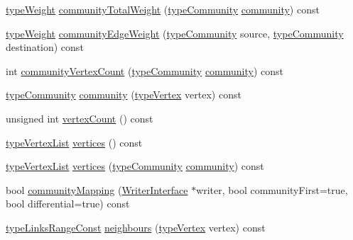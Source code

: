 \begin{DoxyCompactItemize}
\item 
\hyperlink{edge_8h_a2e7ea3be891ac8b52f749ec73fee6dd2}{type\+Weight} \hyperlink{classDynCommBase_a9e7f2493dd9f2381dbfbe94b91ac49f4}{community\+Total\+Weight} (\hyperlink{graphUndirectedGroupable_8h_a914da95c9ea7f14f4b7f875c36818556}{type\+Community} \hyperlink{classDynCommBase_a651753518a2de4ea52caea518e74d878}{community}) const
\item 
\hyperlink{edge_8h_a2e7ea3be891ac8b52f749ec73fee6dd2}{type\+Weight} \hyperlink{classDynCommBase_a1ef408ec71d82b008fc0229416c77b61}{community\+Edge\+Weight} (\hyperlink{graphUndirectedGroupable_8h_a914da95c9ea7f14f4b7f875c36818556}{type\+Community} source, \hyperlink{graphUndirectedGroupable_8h_a914da95c9ea7f14f4b7f875c36818556}{type\+Community} destination) const
\item 
int \hyperlink{classDynCommBase_ad02f1853b63e1ceaf24b05cfdbcf7a49}{community\+Vertex\+Count} (\hyperlink{graphUndirectedGroupable_8h_a914da95c9ea7f14f4b7f875c36818556}{type\+Community} \hyperlink{classDynCommBase_a651753518a2de4ea52caea518e74d878}{community}) const
\item 
\hyperlink{graphUndirectedGroupable_8h_a914da95c9ea7f14f4b7f875c36818556}{type\+Community} \hyperlink{classDynCommBase_a651753518a2de4ea52caea518e74d878}{community} (\hyperlink{edge_8h_a5fbd20c46956d479cb10afc9855223f6}{type\+Vertex} vertex) const
\item 
unsigned int \hyperlink{classDynCommBase_ae415f1a7792158845f69d6850b762d87}{vertex\+Count} () const
\item 
\hyperlink{graphInterface_8h_a21d54d8a139def524d3b0d6f71ec4974}{type\+Vertex\+List} \hyperlink{classDynCommBase_ae240fba572935f26a72f73e39e115169}{vertices} () const
\item 
\hyperlink{graphInterface_8h_a21d54d8a139def524d3b0d6f71ec4974}{type\+Vertex\+List} \hyperlink{classDynCommBase_ae56cd1fc5a69fcd4d0e0a073f3f2e36b}{vertices} (\hyperlink{graphUndirectedGroupable_8h_a914da95c9ea7f14f4b7f875c36818556}{type\+Community} \hyperlink{classDynCommBase_a651753518a2de4ea52caea518e74d878}{community}) const
\item 
bool \hyperlink{classDynCommBase_a75ed5e0546d756a3b327f41e292620b2}{community\+Mapping} (\hyperlink{classWriterInterface}{Writer\+Interface} $\ast$writer, bool community\+First=true, bool differential=true) const
\item 
\hyperlink{graphInterface_8h_ae8d27008f15586bbf419af7ad2e0a48a}{type\+Links\+Range\+Const} \hyperlink{classDynCommBase_a3500faab82a0547422b2202b79f49718}{neighbours} (\hyperlink{edge_8h_a5fbd20c46956d479cb10afc9855223f6}{type\+Vertex} vertex) const

\end{DoxyCompactItemize}
